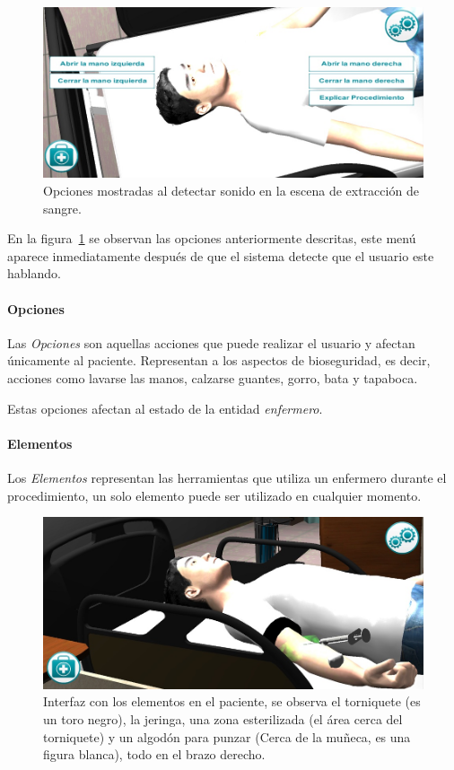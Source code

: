 \begin{figure}[H]
\centering
\includegraphics[scale=0.5]{propuesta/hemocultivo_comando_voz.jpg}
\caption{Opciones mostradas al detectar sonido en la escena de extracción
    de sangre.}
\label{fig:hemocultivo_voz_gui}
\end{figure}

En la figura~\ref{fig:hemocultivo_voz_gui} se observan las opciones anteriormente
descritas, este menú aparece inmediatamente después de que el sistema detecte
que el usuario este hablando.

\paragraph{Opciones}

Las \emph{Opciones} son aquellas acciones que puede realizar el usuario y afectan
únicamente al paciente. Representan a los aspectos de bioseguridad, es decir,
acciones como lavarse las manos, calzarse guantes, gorro, bata y tapaboca.

Estas opciones afectan al estado de la entidad \emph{enfermero}.

\paragraph{Elementos}

Los \emph{Elementos} representan las herramientas que utiliza un enfermero
durante el procedimiento, un solo elemento puede ser utilizado en cualquier
momento.


\begin{figure}[H]
\centering
\includegraphics[scale=0.5]{propuesta/hemocultivo_elementos.jpg}
\caption{Interfaz con los elementos en el paciente, se observa el torniquete (es
    un toro negro), la jeringa, una zona esterilizada (el área cerca del
    torniquete) y un algodón para punzar (Cerca de la muñeca, es una figura
    blanca), todo en el brazo derecho.}
\label{fig:hemocultivo_elementos}
\end{figure}

